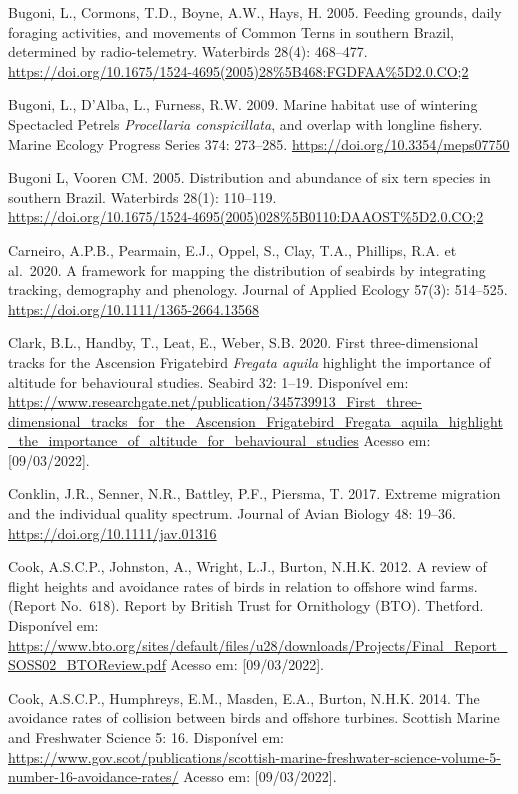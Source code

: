 \documentclass[
  oneside]{scrbook}
\begin{document}
Bugoni, L., Cormons, T.D., Boyne, A.W., Hays, H. 2005. Feeding grounds, daily foraging activities, and movements of Common Terns in southern Brazil, determined by radio-telemetry. Waterbirds 28(4): 468--477. \url{https://doi.org/10.1675/1524-4695(2005)28\%5B468:FGDFAA\%5D2.0.CO;2}

Bugoni, L., D'Alba, L., Furness, R.W. 2009. Marine habitat use of wintering Spectacled Petrels \emph{Procellaria conspicillata}, and overlap with longline fishery. Marine Ecology Progress Series 374: 273--285. \url{https://doi.org/10.3354/meps07750}

Bugoni L, Vooren CM. 2005. Distribution and abundance of six tern species in southern Brazil. Waterbirds 28(1): 110--119.\\
\url{https://doi.org/10.1675/1524-4695(2005)028\%5B0110:DAAOST\%5D2.0.CO;2}

Carneiro, A.P.B., Pearmain, E.J., Oppel, S., Clay, T.A., Phillips, R.A. et al.~2020. A framework for mapping the distribution of seabirds by integrating tracking, demography and phenology. Journal of Applied Ecology 57(3): 514--525. \url{https://doi.org/10.1111/1365-2664.13568}

Clark, B.L., Handby, T., Leat, E., Weber, S.B. 2020. First three-dimensional tracks for the Ascension Frigatebird \emph{Fregata aquila} highlight the importance of altitude for behavioural studies. Seabird 32: 1--19. Disponível em: \url{https://www.researchgate.net/publication/345739913_First_three-dimensional_tracks_for_the_Ascension_Frigatebird_Fregata_aquila_highlight_the_importance_of_altitude_for_behavioural_studies} Acesso em: {[}09/03/2022{]}.

Conklin, J.R., Senner, N.R., Battley, P.F., Piersma, T. 2017. Extreme migration and the individual quality spectrum. Journal of Avian Biology 48: 19--36. \url{https://doi.org/10.1111/jav.01316}

Cook, A.S.C.P., Johnston, A., Wright, L.J., Burton, N.H.K. 2012. A review of flight heights and avoidance rates of birds in relation to offshore wind farms. (Report No.~618). Report by British Trust for Ornithology (BTO). Thetford. Disponível em: \url{https://www.bto.org/sites/default/files/u28/downloads/Projects/Final_Report_SOSS02_BTOReview.pdf} Acesso em: {[}09/03/2022{]}.

Cook, A.S.C.P., Humphreys, E.M., Masden, E.A., Burton, N.H.K. 2014. The avoidance rates of collision between birds and offshore turbines. Scottish Marine and Freshwater Science 5: 16. Disponível em: \url{https://www.gov.scot/publications/scottish-marine-freshwater-science-volume-5-number-16-avoidance-rates/} Acesso em: {[}09/03/2022{]}.
\end{document}

